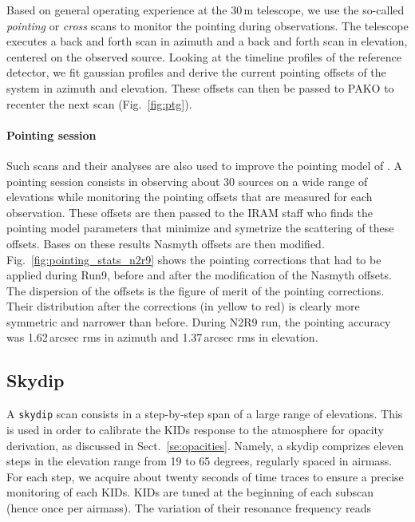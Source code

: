 Based on general operating experience at the 30\,m telescope, we use the so-called
{\em pointing} or {\em cross} scans to monitor the pointing during observations. The
telescope executes a back and forth scan in azimuth and a back and forth scan in
elevation, centered on the observed source. Looking at the timeline profiles of
the reference detector, we fit gaussian profiles and derive the current pointing
offsets of the system in azimuth and elevation. These offsets can then be passed
to PAKO to recenter the next scan (Fig.~\ref{fig:ptg}).

\paragraph{Pointing session}
\label{se:pointing_session}

Such scans and their analyses are also used to improve the pointing model of
\nika. A pointing session consists in observing about 30 sources on a wide range
of elevations  while monitoring the pointing offsets that are measured for each
observation. These offsets are then passed to the IRAM staff who finds the
pointing model parameters that minimize and symetrize the scattering of these
offsets. Bases on these results Nasmyth offsets are then
modified. Fig.~\ref{fig:pointing_stats_n2r9} shows the pointing corrections that
had to be applied during Run9, before and after the modification of the Nasmyth
offsets. The dispersion of the offsets is the figure of merit of the pointing
corrections. Their distribution after the corrections (in yellow to
red) is clearly more symmetric and narrower than before. During N2R9 run, the
pointing accuracy was 1.62\,arcsec rms in azimuth and 1.37\,arcsec rms in
elevation.

\subsection{Skydip}
\label{se:skydip}

A {\tt skydip} scan consists in a step-by-step span of a large range
of elevations.  This is used in order to calibrate the KIDs response
to the atmosphere for opacity derivation, as discussed in
Sect.~\ref{se:opacities}.  Namely, a skydip comprizes eleven steps in
the elevation range from 19 to 65 degrees, regularly spaced in
airmass. For each step, we acquire about twenty seconds of time traces
to ensure a precise monitoring of each KIDs. KIDs are tuned at the beginning of
each subscan (hence once per airmass). The variation of their resonance
frequency reads

